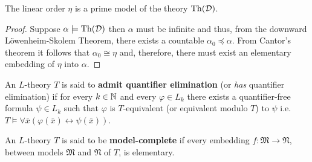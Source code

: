 \begin{thm}
	The linear order $\eta$ is a prime model of the theory $\operatorname{Th}(\mathcal{D})$.
\end{thm}
\begin{proof}
	Suppose $\alpha\models\operatorname{Th}(\mathcal{D})$ then $\alpha$ must be infinite and thus, from the downward L\"owenheim-Skolem Theorem, there exists a countable $\alpha_0\preccurlyeq\alpha$.  From Cantor's theorem it follows that $\alpha_0\cong\eta$ and, therefore, there must exist an elementary embedding of $\eta$ into $\alpha$.
\end{proof}

\begin{dfn}
	An $L$-theory $T$ is said to \textbf{admit quantifier elimination} (or \textit{has} quantifier elimination) if for every $k\in\mathbb{N}$ and every $\varphi\in L_k$ there exists a quantifier-free formula $\psi\in L_k$ such that $\varphi$ is $T$-equivalent (or equivalent modulo $T$) to $\psi$ i.e.\ $T\models\forall\bar{x}(\varphi(\bar{x})\leftrightarrow\psi(\bar{x}))$.
\end{dfn}

\begin{dfn}
	An $L$-theory $T$ is said to be \textbf{model-complete} if every embedding $f\colon\mathfrak{M}\to\mathfrak{N}$, between models $\mathfrak{M}$ and $\mathfrak{N}$ of $T$, is elementary.
\end{dfn}
